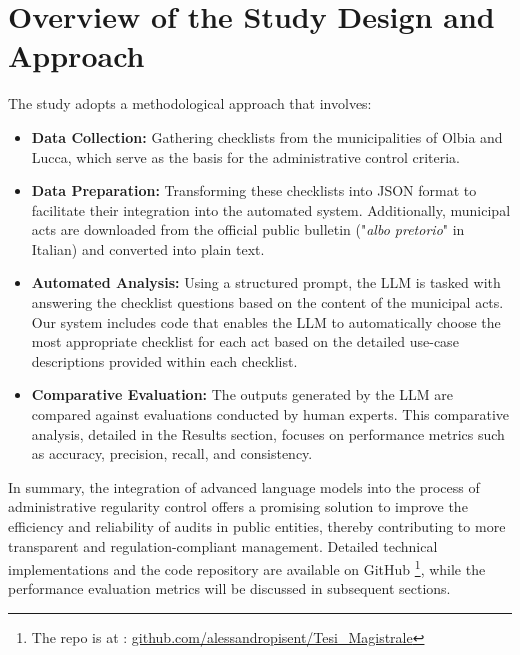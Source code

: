 \documentclass[../main.tex]{subfiles}
\begin{document}
\section{Overview of the Study Design and Approach}
The study adopts a methodological approach that involves:
\begin{itemize}
    \item \textbf{Data Collection:} Gathering checklists from the municipalities of Olbia and Lucca, which serve as the basis for the administrative control criteria.
    
    \item \textbf{Data Preparation:} Transforming these checklists into JSON format to facilitate their integration into the automated system. Additionally, municipal acts are downloaded from the official public bulletin ("\textit{albo pretorio}" in Italian) and converted into plain text.
    
    \item \textbf{Automated Analysis:} Using a structured prompt, the LLM is tasked with answering the checklist questions based on the content of the municipal acts. Our system includes code that enables the LLM to automatically choose the most appropriate checklist for each act based on the detailed use-case descriptions provided within each checklist.
    
    \item \textbf{Comparative Evaluation:} The outputs generated by the LLM are compared against evaluations conducted by human experts. This comparative analysis, detailed in the Results section, focuses on performance metrics such as accuracy, precision, recall, and consistency.
\end{itemize}

\noindent In summary, the integration of advanced language models into the process of administrative regularity control offers a promising solution to improve the efficiency and reliability of audits in public entities, thereby contributing to more transparent and regulation-compliant management. Detailed technical implementations and the code repository are available on GitHub \footnote{The repo is at   : \href{https://github.com/alessandropisent/Tesi\_Magistrale}{github.com/alessandropisent/Tesi\_Magistrale}}, while the performance evaluation metrics will be discussed in subsequent sections.


\ifSubfilesClassLoaded{
    
    
}{}
\end{document}
